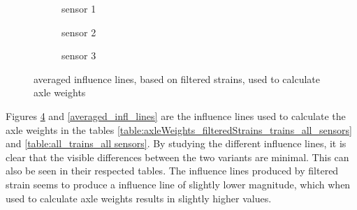 \begin{figure}[h]
	\begin{subfigure}[t]{0.3\textwidth}
		
		\caption{sensor 1}
		\label{fig:sensor1_averaged}
	\end{subfigure}
	\begin{subfigure}[t]{0.3\textwidth}
		
		\caption{sensor 2}
		\label{fig:sensor2_averaged}
	\end{subfigure}
	\begin{subfigure}[t]{0.3\textwidth}
		
		\caption{sensor 3}
		\label{fig:sensor3_averaged}
	\end{subfigure}
	\caption{averaged influence lines, based on filtered strains, used to calculate axle weights}
	\label{averaged_filtered_infl_lines}
\end{figure}

Figures \ref{averaged_filtered_infl_lines} and \ref{averaged_infl_lines} are the influence lines used to calculate the axle weights in the tables \ref{table:axleWeights_filteredStrains_trains_all_sensors} and \ref{table:all_trains_all sensors}. By studying the different influence lines, it is clear that the visible differences between the two variants are minimal. This can also be seen in their respected tables. The influence lines produced by filtered strain seems to produce a influence line of slightly lower magnitude, which when used to calculate axle weights results in slightly higher values.


